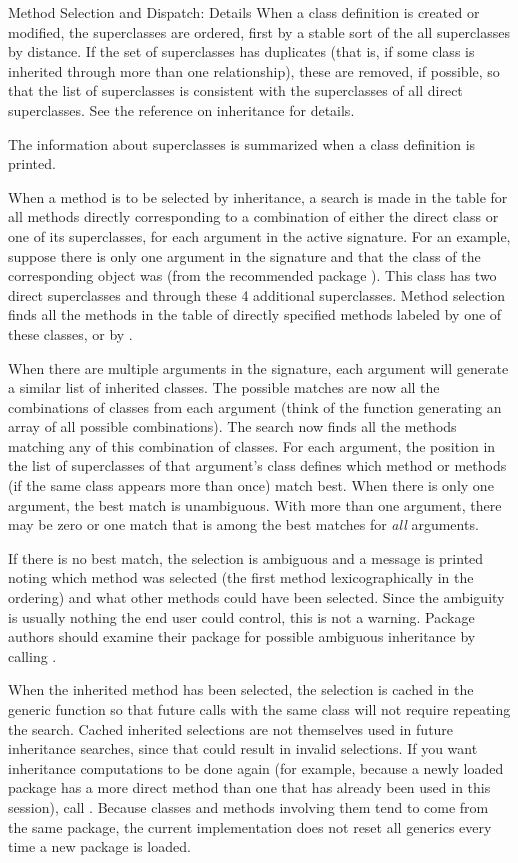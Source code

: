 \begin{Section}{Method Selection and Dispatch: Details}
When a class definition is created or modified, the superclasses
are ordered, first by a stable sort of the all superclasses by
distance.
If the set of superclasses has duplicates (that is, if some class is
inherited through more than one relationship), these are removed, if
possible, so that the list of superclasses is consistent with the
superclasses of all direct superclasses.
See the reference on inheritance for details.

The information about superclasses is summarized when a class
definition is printed.

When a method is to be selected by inheritance, a search is made in
the table for all methods directly corresponding to a combination of
either the direct class or one of its superclasses, for each argument
in the active signature.
For an example, suppose there is only one argument in the signature and that the class of
the corresponding object was  (from the recommended package
).
This class has two direct superclasses and through these 4 additional superclasses.
Method selection finds all the methods in the table of directly
specified methods labeled by one of these classes, or by
.

When there are multiple arguments in the signature, each argument will
generate a similar  list of inherited classes.
The possible matches are now all the combinations of classes from each
argument (think of the function  generating an array of
all possible combinations).
The search now finds all the methods matching any of this combination
of classes.
For each argument, the position in the list of superclasses of that
argument's class defines which method or methods (if the same class
appears more than once) match best.
When there is only one argument, the best match is unambiguous.
With more than one argument, there may be zero or one match that is
among the best matches for \emph{all} arguments.

If there is no best match, the selection is ambiguous and a message is
printed noting which method was selected (the first method
lexicographically in the ordering) and what other methods could have
been selected.
Since the ambiguity is usually nothing the end user could control,
this is not a warning.
Package authors should examine their package for possible ambiguous
inheritance by calling .

When the inherited method has been selected, the selection is cached
in the generic function so that future calls with the same class will
not require repeating the search.  Cached inherited selections are
not themselves used in future inheritance searches, since that could result
in invalid selections.
If you want inheritance computations to be done again (for example,
because a newly loaded package has a more direct method than one
that has already been used in this session), call
.  Because classes and methods involving
them tend to come from the same package, the current implementation
does not reset all generics every time a new package is loaded.


\end{Section}
